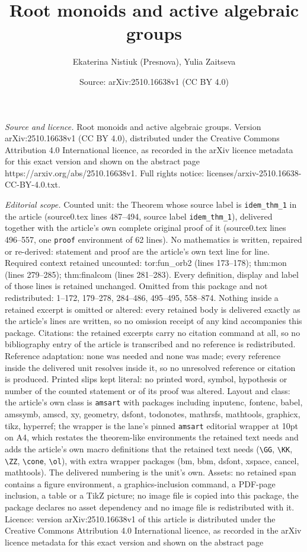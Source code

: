 \documentclass[10pt,a4paper]{amsart}
\title[Root monoids and active algebraic groups]{Root monoids and active algebraic groups}
\author{Ekaterina Nistiuk (Presnova), Yulia Zaitseva}
\date{Source: arXiv:2510.16638v1 (CC BY 4.0)}
\begin{document}
\maketitle

\noindent\emph{Source and licence.} Root monoids and active algebraic groups. Version arXiv:2510.16638v1 (CC BY 4.0), distributed under the Creative Commons Attribution 4.0 International licence, as recorded in the arXiv licence metadata for this exact version and shown on the abstract page https://arxiv.org/abs/2510.16638v1. Full rights notice: licenses/arxiv-2510.16638-CC-BY-4.0.txt.\par\smallskip

\noindent\textit{Editorial scope.} Counted unit: the Theorem whose source label is \texttt{idem\_thm\_1} in the article (source0.tex lines 487--494, source label \texttt{idem\_thm\_1}), delivered together with the article's own complete original proof of it (source0.tex lines 496--557, one \texttt{proof} environment of 62 lines). No mathematics is written, repaired or re-derived: statement and proof are the article's own text line for line. Required context retained uncounted: tor:fun\_orb2 (lines 173--178); thm:mon (lines 279--285); thm:finalcom (lines 281--283). Every definition, display and label of those lines is retained unchanged. Omitted from this package and not redistributed: 1--172, 179--278, 284--486, 495--495, 558--874. Nothing inside a retained excerpt is omitted or altered: every retained body is delivered exactly as the article's lines are written, so no omission receipt of any kind accompanies this package. Citations: the retained excerpts carry no citation command at all, so no bibliography entry of the article is transcribed and no reference is redistributed. Reference adaptation: none was needed and none was made; every reference inside the delivered unit resolves inside it, so no unresolved reference or citation is produced. Printed slips kept literal: no printed word, symbol, hypothesis or number of the counted statement or of its proof was altered. Layout and class: the article's own class is \texttt{amsart} with packages including inputenc, fontenc, babel, amssymb, amscd, xy, geometry, dsfont, todonotes, mathrsfs, mathtools, graphicx, tikz, hyperref; the wrapper is the lane's pinned \texttt{amsart} editorial wrapper at 10pt on A4, which restates the theorem-like environments the retained text needs and adds the article's own macro definitions that the retained text needs (\texttt{\textbackslash GG}, \texttt{\textbackslash KK}, \texttt{\textbackslash ZZ}, \texttt{\textbackslash cone}, \texttt{\textbackslash ol}), with extra wrapper packages (bm, bbm, dsfont, xspace, cancel, mathtools). The delivered numbering is the unit's own. Assets: no retained span contains a figure environment, a graphics-inclusion command, a PDF-page inclusion, a table or a TikZ picture; no image file is copied into this package, the package declares no asset dependency and no image file is redistributed with it. Licence: version arXiv:2510.16638v1 of this article is distributed under the Creative Commons Attribution 4.0 International licence, as recorded in the arXiv licence metadata for this exact version and shown on the abstract page 
\end{document}
